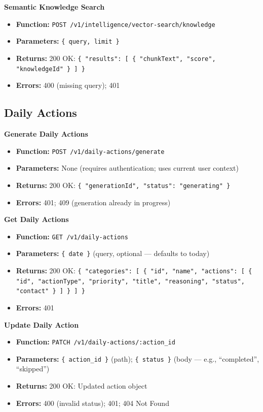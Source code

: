 \documentclass[a4paper]{article}
\begin{document}
\textbf{Semantic Knowledge Search}
\begin{itemize}
  \item \textbf{Function:} \texttt{POST /v1/intelligence/vector-search/knowledge}
  \item \textbf{Parameters:} \texttt{\{ query, limit \}}
  \item \textbf{Returns:} 200 OK: \texttt{\{ "results": [ \{ "chunkText", "score", "knowledgeId" \} ] \}}
  \item \textbf{Errors:} 400 (missing query); 401
\end{itemize}

\subsection{Daily Actions}

\textbf{Generate Daily Actions}
\begin{itemize}
  \item \textbf{Function:} \texttt{POST /v1/daily-actions/generate}
  \item \textbf{Parameters:} None (requires authentication; uses current user context)
  \item \textbf{Returns:} 200 OK: \texttt{\{ "generationId", "status": "generating" \}}
  \item \textbf{Errors:} 401; 409 (generation already in progress)
\end{itemize}

\textbf{Get Daily Actions}
\begin{itemize}
  \item \textbf{Function:} \texttt{GET /v1/daily-actions}
  \item \textbf{Parameters:} \texttt{\{ date \}} (query, optional --- defaults to today)
  \item \textbf{Returns:} 200 OK: \texttt{\{ "categories": [ \{ "id", "name", "actions": [ \{ "id", "actionType", "priority", "title", "reasoning", "status", "contact" \} ] \} ] \}}
  \item \textbf{Errors:} 401
\end{itemize}

\textbf{Update Daily Action}
\begin{itemize}
  \item \textbf{Function:} \texttt{PATCH /v1/daily-actions/:action\_id}
  \item \textbf{Parameters:} \texttt{\{ action\_id \}} (path); \texttt{\{ status \}} (body --- e.g., ``completed'', ``skipped'')
  \item \textbf{Returns:} 200 OK: Updated action object
  \item \textbf{Errors:} 400 (invalid status); 401; 404 Not Found
\end{itemize}
\end{document}

